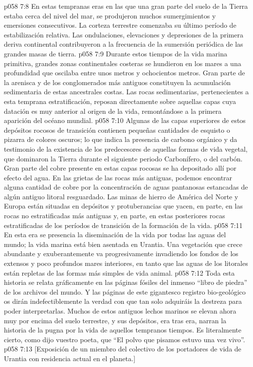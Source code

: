 \vs p058 7:8 \pc En estas tempranas eras en las que una gran parte del suelo de la Tierra estaba cerca del nivel del mar, se produjeron muchos sumergimientos y emersiones consecutivos. La corteza terrestre comenzaba su último período de estabilización relativa. Las ondulaciones, elevaciones y depresiones de la primera deriva continental contribuyeron a la frecuencia de la sumersión periódica de las grandes masas de tierra.
\vs p058 7:9 Durante estos tiempos de la vida marina primitiva, grandes zonas continentales costeras se hundieron en los mares a una profundidad que oscilaba entre unos metros y ochocientos metros. Gran parte de la arenisca y de los conglomerados más antiguos constituyen la acumulación sedimentaria de estas ancestrales costas. Las rocas sedimentarias, pertenecientes a esta temprana estratificación, reposan directamente sobre aquellas capas cuya datación es muy anterior al origen de la vida, remontándose a la primera aparición del océano mundial.
\vs p058 7:10 Algunas de las capas superiores de estos depósitos rocosos de transición contienen pequeñas cantidades de esquisto o pizarra de colores oscuros; lo que indica la presencia de carbono orgánico y da testimonio de la existencia de los predecesores de aquellas formas de vida vegetal, que dominaron la Tierra durante el siguiente periodo Carbonífero, o del carbón. Gran parte del cobre presente en estas capas rocosas se ha depositado allí por efecto del agua. En las grietas de las rocas más antiguas, podemos encontrar alguna cantidad de cobre por la concentración de aguas pantanosas estancadas de algún antiguo litoral resguardado. Las minas de hierro de América del Norte y Europa están situadas en depósitos y protuberancias que yacen, en parte, en las rocas no estratificadas más antiguas y, en parte, en estas posteriores rocas estratificadas de los períodos de transición de la formación de la vida.
\vs p058 7:11 \pc En esta era se presencia la diseminación de la vida por todas las aguas del mundo; la vida marina está bien asentada en Urantia. Una vegetación que crece abundante y exuberantemente va progresivamente invadiendo los fondos de los extensos y poco profundos mares interiores, en tanto que las aguas de los litorales están repletas de las formas más simples de vida animal.
\vs p058 7:12 \pc Toda esta historia se relata gráficamente en las páginas fósiles del inmenso “libro de piedra” de los archivos del mundo. Y las páginas de este gigantesco registro bio\hyp{}geológico os dirán indefectiblemente la verdad con que tan solo adquiráis la destreza para poder interpretarlas. Muchos de estos antiguos lechos marinos se elevan ahora muy por encima del suelo terrestre, y sus depósitos, era tras era, narran la historia de la pugna por la vida de aquellos tempranos tiempos. Es literalmente cierto, como dijo vuestro poeta, que “El polvo que pisamos estuvo una vez vivo”.
\vsetoff
\vs p058 7:13 [Exposición de un miembro del colectivo de los portadores de vida de Urantia con residencia actual en el planeta.]
